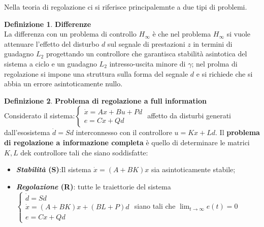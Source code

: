 \documentclass{article}
\theoremstyle{definition}
\newtheorem{definition}{\textbf{Definizione}}
\begin{document}
Nella teoria di regolazione ci si riferisce principalemnte a due tipi di problemi.
\begin{definition}{\textbf{Differenze}}\\
    La differenza con un problema di controllo \(H_{\infty }\) è che nel problema \(H_{\infty }\) si vuole attenuare l'effetto del disturbo \(d\) sul segnale di prestazioni \(z\) in termini di guadagno \(L_{2}\) progettando un controllore che garantisca stabilità asintotica del sistema a ciclo e un guadagno \(L_{2}\) intresso-uscita minore di \(\gamma \); nel prolma di regolazione si impone una struttura sulla forma del segnale \(d\) e si richiede che si abbia un errore asintoticamente nullo.
\end{definition}
\begin{definition}{\textbf{Problema di regolazione a full information}}\\
	Considerato il sistema:\(\begin{cases}
		\dot{x}=Ax+Bu+Pd \\
		e=Cx+Qd
	\end{cases}\) affetto da disturbi generati dall'esosistema \(\dot{d}=Sd\) interconnesso con il controllore \(u=K x+L d\). Il \textbf{problema di regolazione a informazione completa} è quello di determinare le matrici \(K,L\) dek controllore tali che siano soddisfatte:
    \begin{itemize}
		\item \textbf{\emph{Stabilità} (S)}:Il sistema \(\dot{x}=(A+BK)x\) sia asintoticamente stabile;
		\item \textbf{\emph{Regolazione} (R)}: tutte le traiettorie del sistema \(\begin{cases}
			      \dot{d}=Sd              \\
			      \dot{x}=(A+BK)x+(BL+P)d \\
			      e=Cx+Qd
		      \end{cases}\) siano tali che \(\lim_{t\rightarrow\infty}e(t)=0\)
	\end{itemize}
\end{definition}
\end{document}
